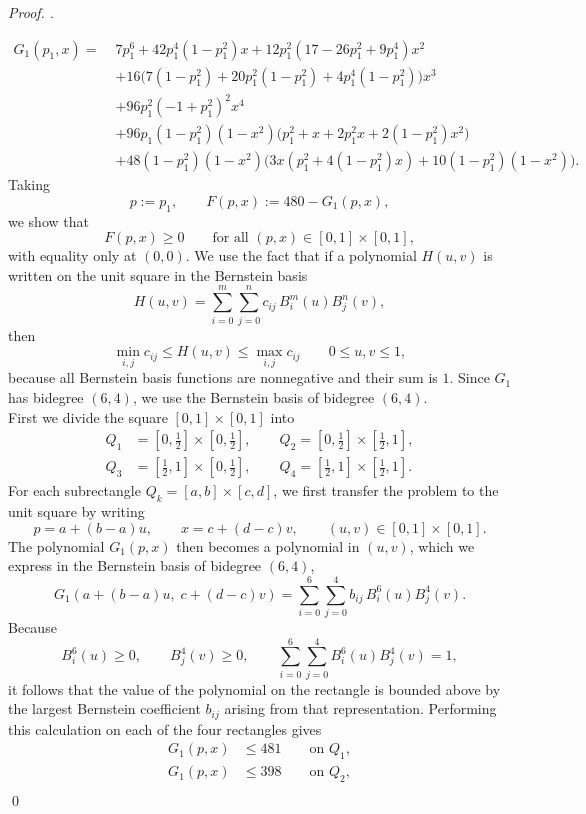 \documentclass[a4paper,12pt,reqno]{amsart} %
\numberwithin{equation}{section}
\theoremstyle{definition}
\newenvironment{pf}[1][]{%
	\vskip 3mm
	\noindent
	\ifthenelse{\equal{#1}{}}%
	{{\slshape Proof. }}%
	{{\slshape #1.} }%
}%
{\qed\bigskip}
\begin{document}
\begin{pf}
\[
\begin{aligned}
G_1(p_1,x)=\;&7 p_1^6 + 42 p_1^4 (1-p_1^2)x + 12 p_1^2(17-26p_1^2+9p_1^4)x^2 \\
&+16\bigl(7(1-p_1^2)+20p_1^2(1-p_1^2)+4p_1^4(1-p_1^2)\bigr)x^3 \\
&+96p_1^2(-1+p_1^2)^2x^4 \\
&+96p_1(1-p_1^2)(1-x^2)\bigl(p_1^2+x+2p_1^2x+2(1-p_1^2)x^2\bigr) \\
&+48(1-p_1^2)(1-x^2)\bigl(3x(p_1^2+4(1-p_1^2)x)+10(1-p_1^2)(1-x^2)\bigr).
\end{aligned}
\]
Taking
\[
p:=p_1,
\qquad
F(p,x):=480-G_1(p,x),
\]
we show that
\[
F(p,x)\ge 0
\qquad \text{for all }(p,x)\in[0,1]\times[0, 1],
\]
with equality only at $(0,0)$.
We use the fact that if a polynomial $H(u,v)$ is written on the unit square in the  Bernstein basis
\[
H(u,v)=\sum_{i=0}^{m}\sum_{j=0}^{n} c_{ij}\,B_i^m(u)B_j^n(v),
\]
then
\[
\min_{i,j} c_{ij}\le H(u,v)\le \max_{i,j} c_{ij}
\qquad 0\le u,v\le 1,
\]
because all Bernstein basis functions are nonnegative and their sum is $1$.
Since $G_1$ has bidegree $(6,4)$, we use the  Bernstein basis of bidegree $(6,4)$.\\[2mm]
First we divide the square \([0, 1]\times[0, 1]\) into
\begin{align*}
Q_1&=\left[0,\frac12\right]\times\left[0,\frac12\right],\qquad
Q_2=\left[0,\frac12\right]\times\left[\frac12,1\right],\\[3mm]
Q_3&=\left[\frac12,1\right]\times\left[0,\frac12\right],\qquad
Q_4=\left[\frac12,1\right]\times\left[\frac12,1\right].
\end{align*}
For each subrectangle \(Q_k=[a,b]\times[c,d]\), we first transfer the problem to the unit square by writing
\[
p=a+(b-a)u,\qquad x=c+(d-c)v,\qquad (u,v)\in[0, 1]\times[0, 1].
\]
The polynomial \(G_1(p,x)\) then becomes a polynomial in \((u,v)\), which we express in the Bernstein basis of bidegree \((6,4)\),
\[
G_1(a+(b-a)u,\;c+(d-c)v)
=
\sum_{i=0}^{6}\sum_{j=0}^{4} b_{ij}\,B_i^6(u)B_j^4(v).
\]
Because
\[
B_i^6(u)\ge 0,\qquad B_j^4(v)\ge 0,
\qquad
\sum_{i=0}^{6}\sum_{j=0}^{4} B_i^6(u)B_j^4(v)=1,
\]
it follows that the value of the polynomial on the rectangle is bounded above by the largest Bernstein coefficient \(b_{ij}\) arising from that representation. Performing this calculation on each of the four rectangles gives
\begin{align*}
G_1(p,x) &\le 481 \qquad \text{on } Q_1,\\[2mm]
G_1(p,x) &\le 398 \qquad \text{on } Q_2,\\[2mm]

\end{align*}
\end{pf}
\end{document}
